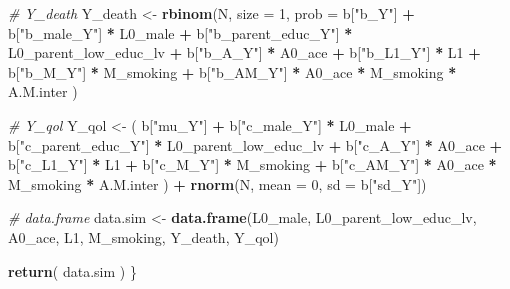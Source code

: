 \documentclass[
]{book}
\newenvironment{Shaded}{\begin{snugshade}}{\end{snugshade}}
\newcommand{\AttributeTok}[1]{\textcolor[rgb]{0.13,0.29,0.53}{#1}}
\newcommand{\CommentTok}[1]{\textcolor[rgb]{0.56,0.35,0.01}{\textit{#1}}}
\newcommand{\DecValTok}[1]{\textcolor[rgb]{0.00,0.00,0.81}{#1}}
\newcommand{\FunctionTok}[1]{\textcolor[rgb]{0.13,0.29,0.53}{\textbf{#1}}}
\newcommand{\NormalTok}[1]{#1}
\newcommand{\OtherTok}[1]{\textcolor[rgb]{0.56,0.35,0.01}{#1}}
\newcommand{\SpecialCharTok}[1]{\textcolor[rgb]{0.81,0.36,0.00}{\textbf{#1}}}
\newcommand{\StringTok}[1]{\textcolor[rgb]{0.31,0.60,0.02}{#1}}
\begin{document}
\begin{Shaded}
\begin{Highlighting}[]
  \CommentTok{\# Y\_death }
\NormalTok{  Y\_death }\OtherTok{\textless{}{-}} \FunctionTok{rbinom}\NormalTok{(N, }\AttributeTok{size =} \DecValTok{1}\NormalTok{, }\AttributeTok{prob =}\NormalTok{ b[}\StringTok{"b\_Y"}\NormalTok{] }\SpecialCharTok{+} 
\NormalTok{                      b[}\StringTok{"b\_male\_Y"}\NormalTok{] }\SpecialCharTok{*}\NormalTok{ L0\_male }\SpecialCharTok{+} 
\NormalTok{                      b[}\StringTok{"b\_parent\_educ\_Y"}\NormalTok{] }\SpecialCharTok{*}\NormalTok{ L0\_parent\_low\_educ\_lv }\SpecialCharTok{+} 
\NormalTok{                      b[}\StringTok{"b\_A\_Y"}\NormalTok{] }\SpecialCharTok{*}\NormalTok{ A0\_ace }\SpecialCharTok{+} 
\NormalTok{                      b[}\StringTok{"b\_L1\_Y"}\NormalTok{] }\SpecialCharTok{*}\NormalTok{ L1 }\SpecialCharTok{+}
\NormalTok{                      b[}\StringTok{"b\_M\_Y"}\NormalTok{] }\SpecialCharTok{*}\NormalTok{ M\_smoking }\SpecialCharTok{+}
\NormalTok{                      b[}\StringTok{"b\_AM\_Y"}\NormalTok{] }\SpecialCharTok{*}\NormalTok{ A0\_ace }\SpecialCharTok{*}\NormalTok{ M\_smoking }\SpecialCharTok{*}\NormalTok{ A.M.inter ) }
  
  \CommentTok{\# Y\_qol }
\NormalTok{  Y\_qol }\OtherTok{\textless{}{-}}\NormalTok{ ( b[}\StringTok{"mu\_Y"}\NormalTok{] }\SpecialCharTok{+} 
\NormalTok{               b[}\StringTok{"c\_male\_Y"}\NormalTok{] }\SpecialCharTok{*}\NormalTok{ L0\_male }\SpecialCharTok{+} 
\NormalTok{               b[}\StringTok{"c\_parent\_educ\_Y"}\NormalTok{] }\SpecialCharTok{*}\NormalTok{ L0\_parent\_low\_educ\_lv }\SpecialCharTok{+}
\NormalTok{               b[}\StringTok{"c\_A\_Y"}\NormalTok{] }\SpecialCharTok{*}\NormalTok{ A0\_ace }\SpecialCharTok{+}
\NormalTok{               b[}\StringTok{"c\_L1\_Y"}\NormalTok{] }\SpecialCharTok{*}\NormalTok{ L1 }\SpecialCharTok{+}
\NormalTok{               b[}\StringTok{"c\_M\_Y"}\NormalTok{] }\SpecialCharTok{*}\NormalTok{ M\_smoking }\SpecialCharTok{+} 
\NormalTok{               b[}\StringTok{"c\_AM\_Y"}\NormalTok{] }\SpecialCharTok{*}\NormalTok{ A0\_ace }\SpecialCharTok{*}\NormalTok{ M\_smoking }\SpecialCharTok{*}\NormalTok{ A.M.inter ) }\SpecialCharTok{+} 
    \FunctionTok{rnorm}\NormalTok{(N, }\AttributeTok{mean =} \DecValTok{0}\NormalTok{, }\AttributeTok{sd =}\NormalTok{ b[}\StringTok{"sd\_Y"}\NormalTok{])}
  
  \CommentTok{\# data.frame}
\NormalTok{  data.sim }\OtherTok{\textless{}{-}} \FunctionTok{data.frame}\NormalTok{(L0\_male, L0\_parent\_low\_educ\_lv, A0\_ace, L1, M\_smoking, }
\NormalTok{                         Y\_death, Y\_qol)}

  \FunctionTok{return}\NormalTok{( data.sim )}
\NormalTok{\}}
\end{Highlighting}
\end{Shaded}
\end{document}

